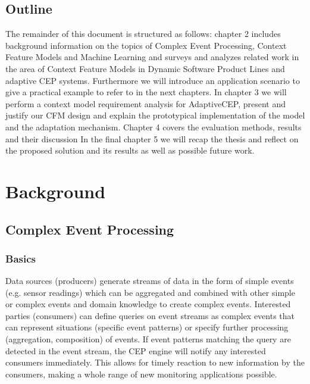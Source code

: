 \section{Outline}
The remainder of this document is structured as follows: 
chapter 2 includes background information on the topics of Complex Event Processing, Context Feature Models and Machine Learning and surveys and analyzes related work in the area of Context Feature Models in Dynamic Software Product Lines and adaptive CEP systems. Furthermore we will introduce an application scenario to give a practical example to refer to in the next chapters.
 In chapter 3 we will perform a context model requirement analysis for AdaptiveCEP, present and justify our CFM design and explain the prototypical implementation of the model and the adaptation mechanism.
 Chapter 4 covers the evaluation methods, results and their discussion
 In the final chapter 5 we will recap the thesis and reflect on the proposed solution and its results as well as possible future work.



\chapter{Background}


\section{Complex Event Processing}

\subsection{Basics}

Data sources (producers) generate streams of data in the form of simple events (e.g. sensor readings) which can be aggregated and combined with other simple or complex events and domain knowledge to create complex events. 
Interested parties (consumers) can define queries on event streams as complex events that can represent situations (specific event patterns) or specify further processing (aggregation, composition) of events.
If event patterns matching the query are detected in the event stream, the CEP engine will notify any interested consumers immediately.
This allows for timely reaction to new information by the consumers, making a whole range of new monitoring applications possible.


